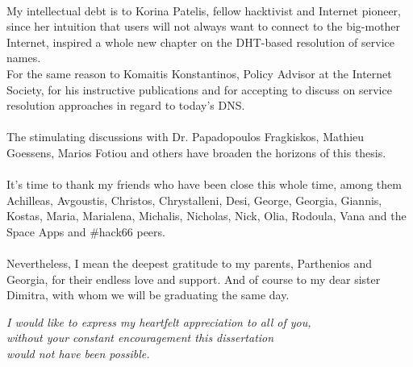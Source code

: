 \paragraph{}
My intellectual debt is to Korina Patelis, fellow hacktivist and Internet pioneer, since her intuition that users will not always want to connect to the big-mother Internet, inspired a whole new chapter on the DHT-based resolution of service names.\\
\indent For the same reason to Komaitis Konstantinos, Policy Advisor at the Internet Society, for his instructive publications and for accepting to discuss on service resolution approaches in regard to today's DNS.

\paragraph{}
The stimulating discussions with Dr. Papadopoulos Fragkiskos, Mathieu Goessens, Marios Fotiou and others have broaden the horizons of this thesis.

\paragraph{}
It's time to thank my friends who have been close this whole time, among them Achilleas, Avgoustis, Christos, Chrystalleni, Desi, George, Georgia, Giannis, Kostas, Maria, Marialena, Michalis, Nicholas, Nick, Olia, Rodoula, Vana and the Space Apps and \#hack66 peers.

\paragraph{}
Nevertheless, I mean the deepest gratitude to my parents, Parthenios and Georgia, for their endless love and support. And of course to my dear sister Dimitra, with whom we will be graduating the same day.\\[0.8cm]


\begin{flushright}
\emph{I would like to express my heartfelt appreciation to all of you,\\
without your constant encouragement this dissertation\\
would not have been possible.}
\end{flushright}